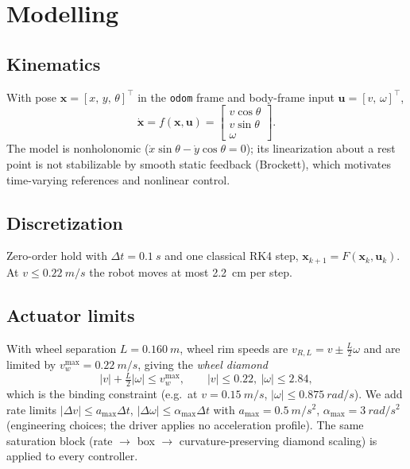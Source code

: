 \documentclass[11pt,a4paper]{article}
\begin{document}
\section{Modelling}
\subsection{Kinematics}
With pose $\bm{x}=[x,\,y,\,\theta]^\top$ in the \texttt{odom} frame and body-frame input $\bm{u}=[v,\,\omega]^\top$,
\begin{equation}
\dot{\bm{x}} = f(\bm{x},\bm{u}) = \begin{bmatrix} v\cos\theta \\ v\sin\theta \\ \omega \end{bmatrix}. \label{eq:unicycle}
\end{equation}
The model is nonholonomic ($\dot x\sin\theta-\dot y\cos\theta=0$); its linearization about a rest point is not stabilizable by smooth static feedback (Brockett), which motivates time-varying references and nonlinear control.

\subsection{Discretization}
Zero-order hold with $\Delta t=\SI{0.1}{s}$ and one classical RK4 step, $\bm{x}_{k+1}=F(\bm{x}_k,\bm{u}_k)$. At $v\le\SI{0.22}{m/s}$ the robot moves at most \SI{2.2}{cm} per step.

\subsection{Actuator limits}
With wheel separation $L=\SI{0.160}{m}$, wheel rim speeds are $v_{R,L}=v\pm\tfrac{L}{2}\omega$ and are limited by $v_w^{\max}=\SI{0.22}{m/s}$, giving the \emph{wheel diamond}
\begin{equation}
|v| + \tfrac{L}{2}|\omega| \le v_w^{\max}, \qquad |v|\le 0.22,\ |\omega|\le 2.84, \label{eq:diamond}
\end{equation}
which is the binding constraint (e.g.\ at $v=\SI{0.15}{m/s}$, $|\omega|\le\SI{0.875}{rad/s}$). We add rate limits $|\Delta v|\le a_{\max}\Delta t$, $|\Delta\omega|\le\alpha_{\max}\Delta t$ with $a_{\max}=\SI{0.5}{m/s^2}$, $\alpha_{\max}=\SI{3}{rad/s^2}$ (engineering choices; the driver applies no acceleration profile). The same saturation block (rate $\to$ box $\to$ curvature-preserving diamond scaling) is applied to every controller.
\end{document}
